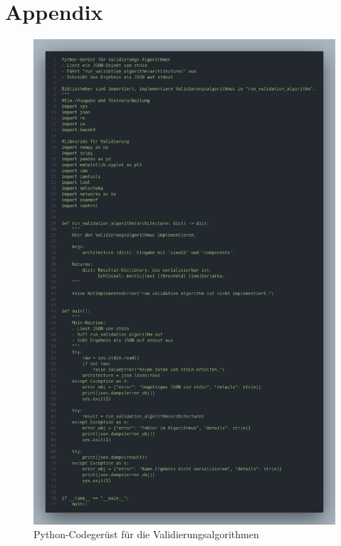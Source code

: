 
\chapter{Appendix}

\begin{figure}[h!]
  \centering
  \includegraphics[height=.765\textheight]{figures/05Implementierung/code.png}
  \caption{Python-Codegerüst für die Validierungsalgorithmen}
  \label{fig:codeskeleton}
\end{figure}


